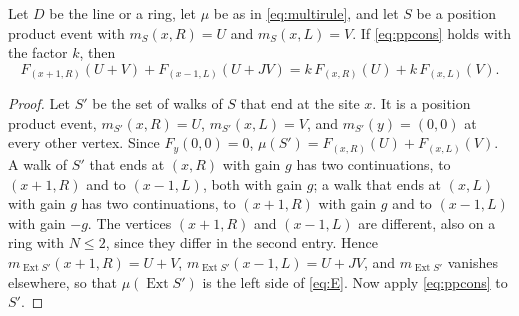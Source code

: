 \begin{lemma}\label{lem:onesite}
Let $D$ be the line or a ring, let $\mu$ be as in \eqref{eq:multirule}, and let $S$ be a position product event with $m_S(x,R)=U$ and $m_S(x,L)=V$. If \eqref{eq:ppcons} holds with the factor $k$, then
\begin{equation}\label{eq:E}
F_{(x+1,R)}(U+V)+F_{(x-1,L)}(U+JV)=k\,F_{(x,R)}(U)+k\,F_{(x,L)}(V).
\end{equation}
\end{lemma}
\begin{proof}
Let $S'$ be the set of walks of $S$ that end at the site $x$. It is a position product event, $m_{S'}(x,R)=U$, $m_{S'}(x,L)=V$, and $m_{S'}(y)=(0,0)$ at every other vertex. Since $F_y(0,0)=0$, $\mu(S')=F_{(x,R)}(U)+F_{(x,L)}(V)$. A walk of $S'$ that ends at $(x,R)$ with gain $g$ has two continuations, to $(x+1,R)$ and to $(x-1,L)$, both with gain $g$; a walk that ends at $(x,L)$ with gain $g$ has two continuations, to $(x+1,R)$ with gain $g$ and to $(x-1,L)$ with gain $-g$. The vertices $(x+1,R)$ and $(x-1,L)$ are different, also on a ring with $N\le2$, since they differ in the second entry. Hence $m_{\operatorname{Ext}S'}(x+1,R)=U+V$, $m_{\operatorname{Ext}S'}(x-1,L)=U+JV$, and $m_{\operatorname{Ext}S'}$ vanishes elsewhere, so that $\mu(\operatorname{Ext}S')$ is the left side of \eqref{eq:E}. Now apply \eqref{eq:ppcons} to $S'$.
\end{proof}

